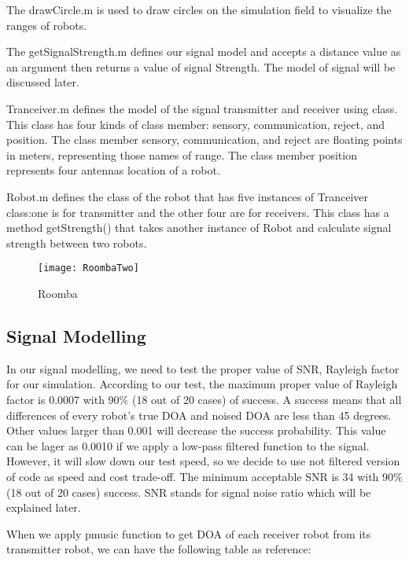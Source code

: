 The drawCircle.m is used to draw circles on the simulation field to visualize the ranges of robots.

The getSignalStrength.m defines our signal model and accepts a distance value as an argument then returns a value of signal Strength. The model of signal will be discussed later.

Tranceiver.m defines the model of the signal transmitter and receiver using class. This class has four kinds of class member: sensory, communication, reject, and position. The class member sensory, communication, and reject are floating points in meters, representing those names of range. The class member position represents four antennas location of a robot.

Robot.m defines the class of the robot that has five instances of Tranceiver class:one is for transmitter and the other four are for receivers. This class has a method getStrength() that takes another instance of Robot and calculate signal strength between two robots. 

\begin{figure}[ht]
	\centering
	\texttt{[image: RoombaTwo]}
	\caption{Roomba}
	\end{figure}

\subsection{Signal Modelling}
In our signal modelling, we need to test the proper value of SNR, Rayleigh factor for our simulation. According to our test, the maximum proper value of Rayleigh factor is 0.0007 with 90\% (18 out of 20 cases) of success. A success means that all differences of every robot's true DOA and noised DOA are less than 45 degrees. Other values larger than 0.001 will decrease the success probability. This value can be lager as 0.0010 if we apply a low-pass filtered function to the signal. However, it will slow down our test speed, so we decide to use not filtered version of code as speed and cost trade-off. The minimum acceptable SNR is 34 with 90\%(18 out of 20 cases) success. SNR stands for signal noise ratio which will be explained later.
\par
	When we apply pmusic function to get DOA of each receiver robot from its transmitter robot, we can have the following table as reference:

